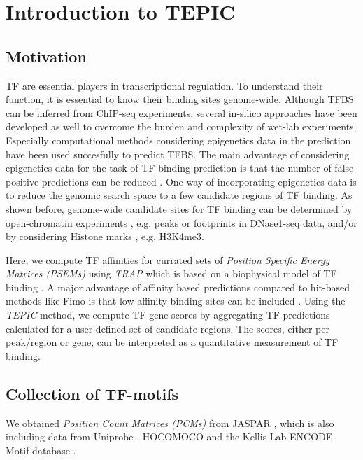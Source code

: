 \documentclass{article}
\begin{document}
\section{Introduction to TEPIC}
\subsection{Motivation}
TF are essential players in transcriptional regulation. To understand their function, it is essential to know their binding sites genome-wide. 
Although TFBS can be inferred from ChIP-seq experiments, several in-silico approaches have been developed as well to overcome the burden and complexity of wet-lab experiments.
Especially computational methods considering epigenetics data in the prediction have been used succesfully to predict TFBS. 
The main advantage of considering epigenetics data for the task of TF binding prediction is that the number of false positive predictions can be reduced \cite{pmid21106904}.
One way of incorporating epigenetics data is to reduce the genomic search space to a few candidate regions of TF binding. 
As shown before, genome-wide candidate sites for TF binding can be determined by open-chromatin experiments \cite{pmid25294828,pmid25086003,pmid22072382,pmid23424114}, e.g. peaks or footprints in DNase1-seq data, 
and/or by considering Histone marks \cite{pmid25489339,pmid25086003}, e.g. H3K4me3. 

Here, we compute TF affinities for currated sets of \textit{Position Specific Energy Matrices (PSEMs)} using \textit{TRAP} \cite{pmid17098775} which is based on a biophysical model of TF binding \cite{von1986specificity}. 
A major advantage of affinity based predictions compared to hit-based methods like Fimo \cite{Grant16022011} is that 
low-affinity binding sites can be included \cite{pmid27899623,pmid17098775}. Using the \textit{TEPIC} method, we compute TF gene scores by aggregating TF predictions calculated for a user defined set of candidate regions.
The scores, either per peak/region or gene, can be interpreted as a quantitative measurement of TF binding. 

\subsection{Collection of TF-motifs}
We obtained \textit{Position Count Matrices (PCMs)} from JASPAR \cite{pmid26531826}, which is also including data from Uniprobe \cite{pmid25378322}, HOCOMOCO \cite{pmid23175603} and the Kellis Lab ENCODE Motif database \cite{pmid24335146}.
\end{document}
